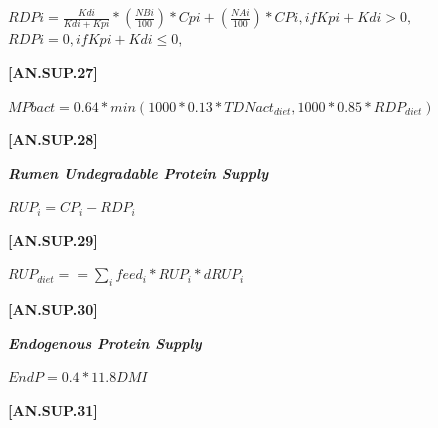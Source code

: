 \begin{refsection}
    \begin{center}
    \(RDPi = \frac{Kdi}{Kdi + Kpi} * (\frac{NBi}{100}) * Cpi + (\frac{NAi}{100}) * CPi, if Kpi + Kdi > 0,\)
    \(RDPi = 0, if Kpi + Kdi \leq 0,\)
    \end{center}
    \vspace{0.5cm}
    
            {\raggedleft \textbf{[AN.SUP.27]}\par}
            \vspace{0.5cm}

    \begin{center}
    \(MPbact = 0.64 * min(1000 * 0.13 * TDNact_{diet}, 1000 * 0.85 * RDP_{diet})\)
    \end{center}
    \vspace{0.5cm}
    
            {\raggedleft \textbf{[AN.SUP.28]}\par}
            \vspace{0.5cm}

    \textbf{\textit{Rumen Undegradable Protein Supply}} 
    \vspace{0.25cm}

    \begin{center}
    \(RUP_{i} = CP_{i} - RDP_{i}\)
    \end{center}
    \vspace{0.5cm}
    
            {\raggedleft \textbf{[AN.SUP.29]}\par}
            \vspace{0.5cm}

    \begin{center}
    \(RUP_{diet} = = \sum_{i} feed_{i} * RUP_{i} * dRUP_{i}\)
    \end{center}
    \vspace{0.5cm}
    
            {\raggedleft \textbf{[AN.SUP.30]}\par}
            \vspace{0.5cm}

    \textbf{\textit{Endogenous Protein Supply}} 
    \vspace{0.25cm}

    \begin{center}
    \(EndP = 0.4 * 11.8 DMI\)
    \end{center}
    \vspace{0.5cm}
    
            {\raggedleft \textbf{[AN.SUP.31]}\par}
            \vspace{0.5cm}


\end{refsection}
